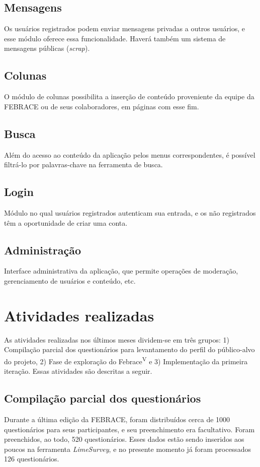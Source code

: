   \subsection{Mensagens}
    Os usuários registrados podem enviar mensagens privadas a outros usuários, e esse módulo oferece essa funcionalidade. Haverá também um sistema de mensagens públicas (\textit{scrap}).

  \subsection{Colunas}
    O módulo de colunas possibilita a inserção de conteúdo proveniente da equipe da FEBRACE ou de seus colaboradores, em páginas com esse fim.

  \subsection{Busca}
    Além do acesso ao conteúdo da aplicação pelos menus correspondentes, é possível filtrá-lo por palavras-chave na ferramenta de busca.

  \subsection{Login}
    Módulo no qual usuários registrados autenticam sua entrada, e os não registrados têm a oportunidade de criar uma conta.

  \subsection{Administração}
    Interface administrativa da aplicação, que permite operações de moderação, gerenciamento de usuários e conteúdo, etc.

\section{Atividades realizadas}
  As atividades realizadas nos últimos meses dividem-se em três grupos: 1) Compilação parcial dos questionários para levantamento do perfil do público-alvo do projeto, 2) Fase de exploração do Febrace\textsuperscript{V} e 3) Implementação da primeira iteração. Essas atividades são descritas a seguir.

  \subsection{Compilação parcial dos questionários}
    Durante a última edição da FEBRACE, foram distribuídos cerca de 1000 questionários para seus participantes, e seu preenchimento era facultativo. Foram preenchidos, ao todo, 520 questionários. Esses dados estão sendo inseridos aos poucos na ferramenta \textit{LimeSurvey}, e no presente momento já foram processados 126 questionários.

